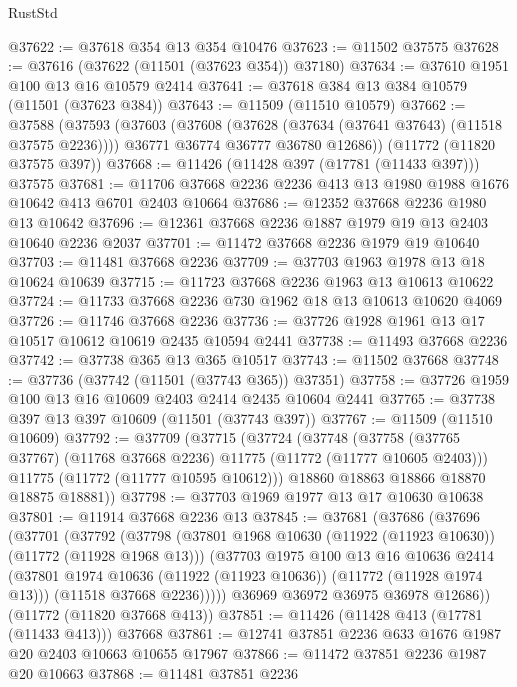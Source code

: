 \begin{lexlean}{RustStd}
\begin{coremodule}
@37622 := @37618 @354 @13 @354 @10476
@37623 := @11502 @37575
@37628 := @37616 (@37622 (@11501 (@37623 @354)) @37180)
@37634 := @37610 @1951 @100 @13 @16 @10579 @2414
@37641 := @37618 @384 @13 @384 @10579 (@11501 (@37623 @384))
@37643 := @11509 (@11510 @10579)
@37662 := @37588
    (@37593
      (@37603
        (@37608 (@37628 (@37634 (@37641 @37643) (@11518 @37575 @2236))))
        @36771
        @36774
        @36777
        @36780
        @12686))
    (@11772 (@11820 @37575 @397))
@37668 := @11426 (@11428 @397 (@17781 (@11433 @397))) @37575
@37681 := @11706 @37668 @2236 @2236 @413 @13 @1980 @1988 @1676 @10642 @413 @6701 @2403 @10664
@37686 := @12352 @37668 @2236 @1980 @13 @10642
@37696 := @12361 @37668 @2236 @1887 @1979 @19 @13 @2403 @10640 @2236 @2037
@37701 := @11472 @37668 @2236 @1979 @19 @10640
@37703 := @11481 @37668 @2236
@37709 := @37703 @1963 @1978 @13 @18 @10624 @10639
@37715 := @11723 @37668 @2236 @1963 @13 @10613 @10622
@37724 := @11733 @37668 @2236 @730 @1962 @18 @13 @10613 @10620 @4069
@37726 := @11746 @37668 @2236
@37736 := @37726 @1928 @1961 @13 @17 @10517 @10612 @10619 @2435 @10594 @2441
@37738 := @11493 @37668 @2236
@37742 := @37738 @365 @13 @365 @10517
@37743 := @11502 @37668
@37748 := @37736 (@37742 (@11501 (@37743 @365)) @37351)
@37758 := @37726 @1959 @100 @13 @16 @10609 @2403 @2414 @2435 @10604 @2441
@37765 := @37738 @397 @13 @397 @10609 (@11501 (@37743 @397))
@37767 := @11509 (@11510 @10609)
@37792 := @37709
    (@37715
      (@37724
        (@37748
          (@37758 (@37765 @37767) (@11768 @37668 @2236) @11775 (@11772 (@11777 @10605 @2403)))
          @11775
          (@11772 (@11777 @10595 @10612)))
        @18860
        @18863
        @18866
        @18870
        @18875
        @18881))
@37798 := @37703 @1969 @1977 @13 @17 @10630 @10638
@37801 := @11914 @37668 @2236 @13
@37845 := @37681
    (@37686
      (@37696
        (@37701
          (@37792
            (@37798
              (@37801 @1968 @10630 (@11922 (@11923 @10630)) (@11772 (@11928 @1968 @13)))
              (@37703
                @1975
                @100
                @13
                @16
                @10636
                @2414
                (@37801 @1974 @10636 (@11922 (@11923 @10636)) (@11772 (@11928 @1974 @13)))
                (@11518 @37668 @2236)))))
        @36969
        @36972
        @36975
        @36978
        @12686))
    (@11772 (@11820 @37668 @413))
@37851 := @11426 (@11428 @413 (@17781 (@11433 @413))) @37668
@37861 := @12741 @37851 @2236 @633 @1676 @1987 @20 @2403 @10663 @10655 @17967
@37866 := @11472 @37851 @2236 @1987 @20 @10663
@37868 := @11481 @37851 @2236

\end{coremodule}
\end{lexlean}
